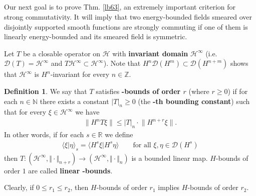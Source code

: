 \documentclass[12pt,b5paper,notitlepage]{article}
\theoremstyle{definition}
\newtheorem{df}{Definition}[section]
\theoremstyle{plain}
\newcommand{\mc}{\mathcal}
\newcommand{\Dom}{\scr{D}}
\newcommand{\bk}[1]{\langle {#1}\rangle}
\newcommand{\scr}{\mathscr}
\newcommand{\Nbb}{\mathbb N}
\newcommand{\Zbb}{\mathbb Z}
\newcommand{\Rbb}{\mathbb R}
\numberwithin{equation}{section}
\begin{document}
\subsection{}


Our next goal is to prove Thm. \ref{lb63}, an extremely important criterion for strong commutativity. It will imply that two energy-bounded fields smeared over disjointly supported smooth functions are strongly commuting if one of them is linearly energy-bounded and its smeared field is symmetric.



Let $T$ be a closable operator on $\mc H$ with \textbf{invariant domain} $\mc H^\infty$ (i.e. $\Dom(T)=\mc H^\infty$ and $T\mc H^\infty\subset\mc H^\infty$). Note that $H^n\Dom(H^m)\subset\Dom(H^{n+m})$ shows that $\mc H^\infty$ is $H^n$-invariant for every $n\in\Zbb$. 

\begin{df}
We say that $T$ satisfies \textbf{-bounds of order $r$} (where $r\geq 0$) if for each $n\in\Nbb$ there exists a constant $|T|_n\geq0$ (the \textbf{-th bounding constant}) such that for every $\xi\in\mc H^\infty$ we have
\begin{align}
\lVert H^nT\xi\lVert\leq |T|_n\cdot \lVert H^{n+r}\xi\lVert.\label{eqa7}	
\end{align}
In other words, if for each $s\in\Rbb$ we define
\begin{align*}
\bk{\xi|\eta}_s=\bk{H^s\xi|H^s\eta}\qquad\text{for all }\xi,\eta\in\Dom(H^s)
\end{align*}
then $T:(\mc H^\infty,\Vert\cdot\Vert_{n+r})\rightarrow (\mc H^\infty,\Vert\cdot\Vert_n)$ is a bounded linear map. $H$-bounds of order $1$ are called \textbf{linear -bounds}.
\end{df}

Clearly, if $0\leq r_1\leq r_2$, then $H$-bounds of order $r_1$ implies $H$-bounds of order $r_2$.
\end{document}
